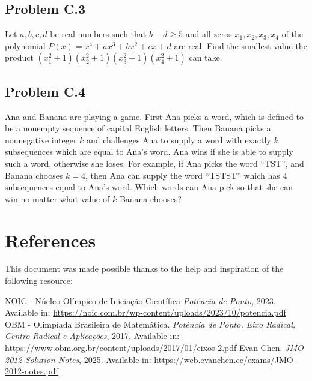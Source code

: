 \documentclass[12pt]{article}
\begin{document}
    \clearpage

    \subsection{Problem C.3}
      \begin{tcolorbox}[problembox]
         Let $a,b,c,d$ be real numbers such that $b-d\ge 5$ and all zeros $x_1,x_2,x_3,x_4$ of the polynomial $P(x)=x^4+ax^3+bx^2+cx+d$ are 
          real. Find the smallest value the product $(x_1^2+1)(x_2^2+1)(x_3^2+1)(x_4^2+1)$ can take.
      \end{tcolorbox}
          
    \clearpage

    \subsection{Problem C.4}
      \begin{tcolorbox}[problembox]
         Ana and Banana are playing a game. First Ana picks a word, which is defined to be a nonempty sequence of capital English
          letters. Then Banana picks a nonnegative integer $k$ and challenges Ana to supply a word with exactly $k$ subsequences which are 
          equal to Ana's word. Ana wins if she is able to supply such a word, otherwise she loses. For example, if Ana picks the word “TST”,
          and Banana chooses $k=4$, then Ana can supply the word “TSTST” which has $4$ subsequences equal to Ana's word. Which words can Ana 
          pick so that she can win no matter what value of $k$ Banana chooses?
      \end{tcolorbox}

  \clearpage

  \section{\textsf{References}}
    This document was made possible thanks to the help and inspiration of the following resource:
    \renewcommand{\refname}{\vspace{-2em}}
    \begin{thebibliography}{9}
      NOIC - Núcleo Olímpico de Iniciação Científica
      \textit{Potência de Ponto}, 2023.
      Available in: \url{https://noic.com.br/wp-content/uploads/2023/10/potencia.pdf}
      OBM - Olimpíada Brasileira de Matemática.
      \textit{Potência de Ponto, Eixo Radical, Centro Radical e Aplicações}, 2017.
      Available in: \url{https://www.obm.org.br/content/uploads/2017/01/eixos-2.pdf}
      Evan Chen.
      \textit{JMO 2012 Solution Notes}, 2025.
      Available in: \url{https://web.evanchen.cc/exams/JMO-2012-notes.pdf}
    \end{thebibliography}
\end{document}
